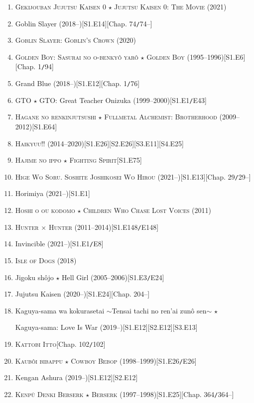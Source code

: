 \documentclass{article}
\numberwithin{equation}{section}
\begin{document}
\begin{enumerate}
    \item \textsc{Gekijouban Jujutsu Kaisen 0 $\star$ Jujutsu Kaisen 0: The Movie} (2021)
    \item Goblin Slayer (2018--)\hfill[S1.E14][Chap. 74\texttt{/}74--]
    \item \textsc{Goblin Slayer: Goblin's Crown} (2020)
    \item \textsc{Golden Boy: Sasurai no o-benky\^o yar\^o $\star$ Golden Boy} (1995--1996)\hfill[S1.E6][Chap. 1\texttt{/}94]
    \item Grand Blue (2018--)\hfill[S1.E12][Chap. 1\texttt{/}76]
    \item GTO $\star$ GTO: Great Teacher Onizuka (1999--2000)\hfill[S1.E1\texttt{/}E43]
    \item \textsc{Hagane no renkinjutsushi $\star$ Fullmetal Alchemist: Brotherhood} (2009--2012)\hfill[S1.E64]
    \item \textsc{Haikyuu!!} (2014--2020)\hfill[S1.E26][S2.E26][S3.E11][S4.E25]
    \item \textsc{Hajime no ippo $\star$ Fighting Spirit}\hfill[S1.E75]
    \item \textsc{Hige Wo Soru. Soshite Joshikosei Wo Hirou} (2021--)\hfill[S1.E13][Chap. 29\texttt{/}29--]
    \item Horimiya (2021--)\hfill[S1.E1]
    \item \textsc{Hoshi o ou kodomo $\star$ Children Who Chase Lost Voices} (2011)
    \item \textsc{Hunter $\times$ Hunter} (2011--2014)\hfill[S1.E148\texttt{/}E148]
    \item Invincible (2021--)\hfill[S1.E1\texttt{/}E8]
    \item \textsc{Isle of Dogs} (2018)
    \item Jigoku shôjo $\star$ Hell Girl (2005--2006)\hfill[S1.E3\texttt{/}E24]
    \item Jujutsu Kaisen (2020--)\hfill[S1.E24][Chap. 204--]
    \item Kaguya-sama wa kokurasetai $\sim$Tensai tachi no ren'ai zun\^o sen$\sim$ $\star$
    
    Kaguya-sama: Love Is War (2019--)\hfill[S1.E12][S2.E12][S3.E13]
    \item \textsc{Kattobi Itto}\hfill[Chap. 102\texttt{/}102]
    \item \textsc{Kaub\^oi bibappu $\star$ Cowboy Bebop} (1998--1999)\hfill[S1.E26\texttt{/}E26]
    \item Kengan Ashura (2019--)\hfill[S1.E12][S2.E12]
    \item \textsc{Kenp\^u Denki Berserk $\star$ Berserk} (1997--1998)\hfill[S1.E25][Chap. 364\texttt{/}364--]
    

\end{enumerate}
\end{document}
